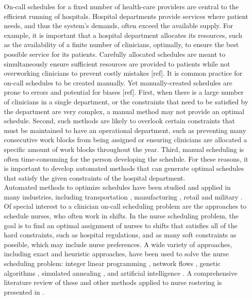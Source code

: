 On-call schedules for a fixed number of health-care providers are central to the efficient running of hospitals. Hospital departments provide services where patient needs, and thus the system's demands, often exceed the available supply. For example, it is important that a hospital department allocates its resources, such as the availability of a finite number of clinicians, optimally, to ensure the best possible service for its patients. Carefully allocated schedules are meant to simultaneously ensure sufficient resources are provided to patients while not overworking clinicians to prevent costly mistakes [ref]. It is common practice for on-call schedules to be created manually. Yet manually-created schedules are prone to errors and potential for biases [ref]. First, when there is a large number of clinicians in a single department, or the constraints that need to be satisfied by the department are very complex, a manual method may not provide an optimal schedule. Second, such methods are likely to overlook certain constraints that must be maintained to have an operational department, such as preventing many consecutive work blocks from being assigned or ensuring clinicians are allocated a specific amount of work blocks throughout the year. Third, manual scheduling is often time-consuming for the person developing the schedule. For these reasons, it is important to develop automated methods that can generate optimal schedules that satisfy the given constraints of the hospital department. \\

Automated methods to optimize schedules have been studied and applied in many industries, including transportation \cite{aickelin_improved_2006, goel_truck_2012, gunther_combined_2010}, manufacturing \cite{al-yakoob_mixed-integer_2007, al-yakoob_column_2008, alfares_simulation_2007}, retail \cite{chapados_retail_2011, nissen_automatic_2010} and military \cite{horn_scheduling_2007, laguna_modeling_2005}. Of special interest to a clinician on-call scheduling problem are the approaches to schedule nurses, who often work in shifts. In the nurse scheduling problem, the goal is to find an optimal assignment of nurses to shifts that satisfies all of the hard constraints, such as hospital regulations, and as many soft constraints as possible, which may include nurse preferences. A wide variety of approaches, including exact and heuristic approaches, have been used to solve the nurse scheduling problem: integer linear programming \cite{azaiez_0-1_2005, trilling_nurse_2006, widyastiti_nurses_2016}, network flows \cite{el_adoly_new_2018}, genetic algorithms \cite{aickelin_exploiting_2000, jan_evolutionary_2000, kawanaka_genetic_2001}, simulated annealing \cite{jaszkiewicz_metaheuristic_1997}, and artificial intelligence \cite{abdennadher_nurse_nodate, li_hybrid_2003}. A comprehensive literature review of these and other methods applied to nurse rostering is presented in \cite{burke_state_2004}. \\

